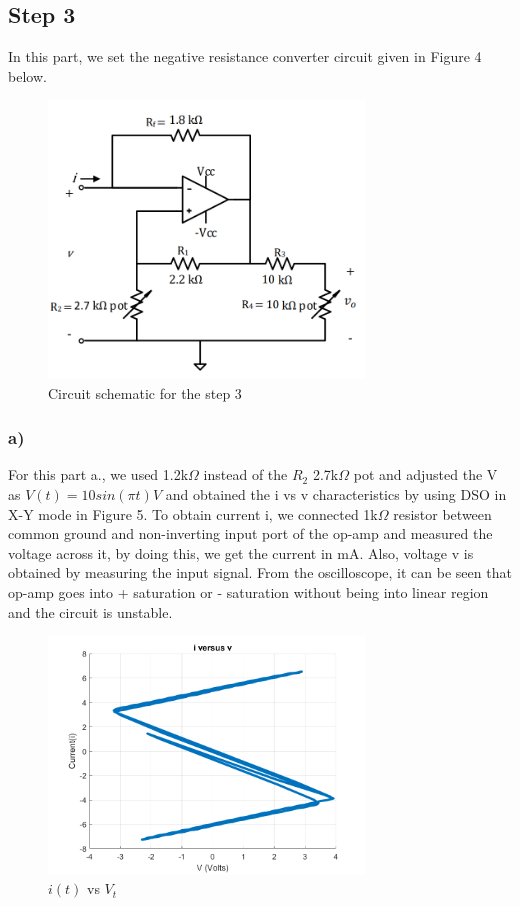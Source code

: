 \documentclass[letterpaper,12pt]{article}
\begin{document}
\subsection{Step 3}

In this part, we set the negative resistance converter circuit given in Figure 4 below.
\begin{figure}[H]
    \centering
    \includegraphics[width = 0.75\textwidth]{3SCH.png}
    \caption{Circuit schematic for the step 3}
\end{figure} 

  
\subsubsection{a)}
For this part a., we used 1.2k\(\Omega\) instead of the \(R_2\) 2.7k\(\Omega\) pot and adjusted the V as \(V(t) = 10sin(\pi t)V\) and obtained the i vs v characteristics by using DSO in X-Y mode in Figure 5. To obtain current i, we connected 1k\(\Omega\) resistor between common ground and non-inverting input port of the op-amp and measured the voltage across it, by doing this, we get the current in mA. Also, voltage v is obtained by measuring the input signal. From the oscilloscope, it can be seen that op-amp goes into + saturation or - saturation without being into linear region and the circuit is unstable.
\begin{figure}[H]
    \centering
    \includegraphics[width = 0.75\textwidth]{3a.png}
    \caption{\(i(t)\) vs \(V_{t}\)}
\end{figure} 
\end{document}
